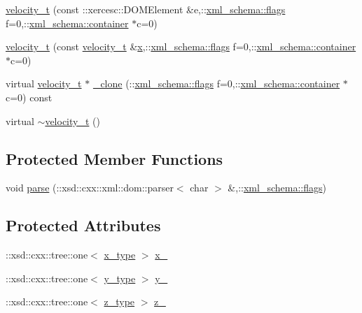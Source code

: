 \begin{DoxyCompactItemize}
\item 
\hyperlink{classvelocity__t_aac1f9f9123219851a0cf1bba38da4928}{velocity\-\_\-t} (const \-::xercesc\-::\-D\-O\-M\-Element \&e,\-::\hyperlink{namespacexml__schema_a0612287d030cb2732d31a45b258fdc87}{xml\-\_\-schema\-::flags} f=0,\-::\hyperlink{namespacexml__schema_ada9aa30dc722e93ee2ed7243085402a5}{xml\-\_\-schema\-::container} $\ast$c=0)
\item 
\hyperlink{classvelocity__t_ab0367cbbb5f78bb36bb7a6bb2eb1c965}{velocity\-\_\-t} (const \hyperlink{classvelocity__t}{velocity\-\_\-t} \&\hyperlink{classvelocity__t_adc045e174c1631079cef733f987193c1}{x},\-::\hyperlink{namespacexml__schema_a0612287d030cb2732d31a45b258fdc87}{xml\-\_\-schema\-::flags} f=0,\-::\hyperlink{namespacexml__schema_ada9aa30dc722e93ee2ed7243085402a5}{xml\-\_\-schema\-::container} $\ast$c=0)
\item 
virtual \hyperlink{classvelocity__t}{velocity\-\_\-t} $\ast$ \hyperlink{classvelocity__t_aaad3aac74b44916ce11b0312884a88ac}{\-\_\-clone} (\-::\hyperlink{namespacexml__schema_a0612287d030cb2732d31a45b258fdc87}{xml\-\_\-schema\-::flags} f=0,\-::\hyperlink{namespacexml__schema_ada9aa30dc722e93ee2ed7243085402a5}{xml\-\_\-schema\-::container} $\ast$c=0) const 
\item 
virtual \hyperlink{classvelocity__t_a5222577cd4e9f86f2cba6b44b8d416f8}{$\sim$velocity\-\_\-t} ()
\end{DoxyCompactItemize}
\subsection*{Protected Member Functions}
\begin{DoxyCompactItemize}
\item 
void \hyperlink{classvelocity__t_a815462c106c5ce40960f75cc331238e1}{parse} (\-::xsd\-::cxx\-::xml\-::dom\-::parser$<$ char $>$ \&,\-::\hyperlink{namespacexml__schema_a0612287d030cb2732d31a45b258fdc87}{xml\-\_\-schema\-::flags})
\end{DoxyCompactItemize}
\subsection*{Protected Attributes}
\begin{DoxyCompactItemize}
\item 
\-::xsd\-::cxx\-::tree\-::one$<$ \hyperlink{classvelocity__t_a96ff8f29edf435cfe0966409d22b33c7}{x\-\_\-type} $>$ \hyperlink{classvelocity__t_a648b432726339999caac51c3c72cb0de}{x\-\_\-}
\item 
\-::xsd\-::cxx\-::tree\-::one$<$ \hyperlink{classvelocity__t_aab88921abbd89667cc4d293a448877f3}{y\-\_\-type} $>$ \hyperlink{classvelocity__t_a6440f1e25ccd5916aff385482257ea71}{y\-\_\-}
\item 
\-::xsd\-::cxx\-::tree\-::one$<$ \hyperlink{classvelocity__t_a0268003d7669eaa63abdcd4df2933316}{z\-\_\-type} $>$ \hyperlink{classvelocity__t_a86e3de3b673d7c4f67aae4c3d866c17d}{z\-\_\-}
\end{DoxyCompactItemize}


